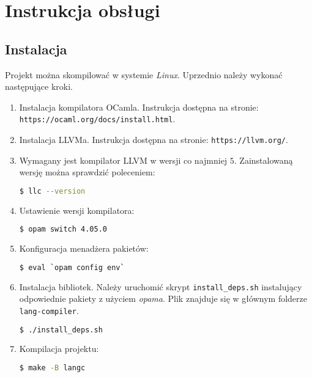 \documentclass[declaration,shortabstract]{iithesis}
\begin{document}

\chapter{Instrukcja obsługi}

\section{Instalacja}

Projekt można skompilować w systemie \textit{Linux}.
Uprzednio należy wykonać następujące kroki. 

\begin{enumerate}
  \item Instalacja kompilatora OCamla. Instrukcja dostępna na stronie: \newline
  \texttt{https://ocaml.org/docs/install.html}.
  \item Instalacja LLVMa. Instrukcja dostępna na stronie: \newline
  \texttt{https://llvm.org/}.
  \item Wymagany jest kompilator LLVM w wersji co najmniej $5$. Zainstalowaną 
  wersję można sprawdzić poleceniem:
  \begin{lstlisting}[language=bash]
  $ llc --version
  \end{lstlisting}
  \item Ustawienie wersji kompilatora:
  \begin{lstlisting}[language=bash]
  $ opam switch 4.05.0
  \end{lstlisting}
  \item Konfiguracja menadżera pakietów:
  \begin{lstlisting}[language=bash]
  $ eval `opam config env`
  \end{lstlisting}
  \item Instalacja bibliotek. Należy uruchomić skrypt \texttt{install\_deps.sh}
   instalujący odpowiednie pakiety z użyciem \textit{opama}. Plik znajduje się 
   w głównym folderze 
  \texttt{lang-compiler}. 
  \begin{lstlisting}[language=bash]
  $ ./install_deps.sh
  \end{lstlisting}
  \item Kompilacja projektu:
  \begin{lstlisting}[language=bash]
  $ make -B langc
  \end{lstlisting}
\end{enumerate}
\end{document}
